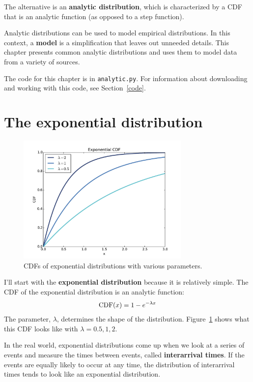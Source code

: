 \documentclass[12pt]{book}
\begin{document}
The alternative is an {\bf analytic distribution}, which is
characterized by a CDF that is an analytic function (as opposed to a
step function).

Analytic distributions can be used to model empirical distributions.
In this context, a {\bf model} is a simplification that leaves out
unneeded details.  This chapter presents common analytic distributions
and uses them to model data from a variety of sources.

The code for this chapter is in {\tt analytic.py}.  For information
about downloading and working with this code, see Section~\ref{code}.



\section{The exponential distribution}
\label{exponential}

\begin{figure}
\centerline{\includegraphics[height=2.5in]{figs/analytic_expo_cdf.pdf}}
\caption{CDFs of exponential distributions with various parameters.}
\label{analytic_expo_cdf}
\end{figure}

I'll start with the {\bf exponential distribution} because it is
relatively simple.  The CDF of the exponential distribution is an
analytic function:
%
\[ \mathrm{CDF}(x) = 1 - e^{-\lambda x} \]
%
The parameter, $\lambda$, determines the shape of the distribution.
Figure~\ref{analytic_expo_cdf} shows what this CDF looks like with
$\lambda = 0.5, 1, 2$.

In the real world, exponential distributions
come up when we look at a series of events and measure the
times between events, called {\bf interarrival times}.
If the events are equally likely to occur at any time, the distribution
of interarrival times tends to look like an exponential distribution.
\end{document}
